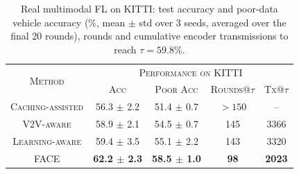 \begin{table}[t]
    \centering
    \caption{Real multimodal FL on KITTI: test accuracy and poor-data vehicle accuracy (\%, mean $\pm$ std over 3 seeds, averaged over the final 20 rounds), rounds and cumulative encoder transmissions to reach $\tau=59.8\%$.}
    \label{tab:real_kitti}
    \renewcommand{\arraystretch}{1.15}
    \setlength{\tabcolsep}{4.5pt}
    \begin{tabular}{c|c|c|c|c}
        \hline
        \multirow{2}{*}{\textsc{Method}} & \multicolumn{4}{c}{\textsc{Performance on KITTI}} \\
        & \textsc{Acc} & \textsc{Poor Acc} & \textsc{Rounds@$\tau$} & \textsc{Tx@$\tau$} \\
        \hline
        \textsc{Caching-assisted} & 56.3 $\pm$ 2.2 & 51.4 $\pm$ 0.7 & $>150$ & -- \\
        \textsc{V2V-aware} & 58.9 $\pm$ 2.1 & 54.5 $\pm$ 0.7 & 145 & 3366 \\
        \textsc{Learning-aware} & 59.4 $\pm$ 3.5 & 55.1 $\pm$ 2.2 & 143 & 3320 \\
        \hline
        \textsc{FACE} & \textbf{62.2 $\pm$ 2.3} & \textbf{58.5 $\pm$ 1.0} & \textbf{98} & \textbf{2023} \\
        \hline
    \end{tabular}
\end{table}
